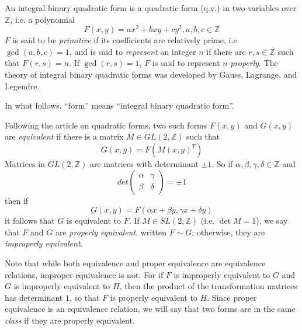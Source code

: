 \documentclass[12pt]{article}
\newcommand{\BZ}{\mathbb{Z}}
\theoremstyle{definition}
\begin{document}
An integral binary quadratic form is a quadratic form (q.v.) in two variables over $\BZ$, i.e. a polynomial
\[
  F(x,y)=ax^2+bxy+cy^2, a,b,c\in\BZ
\]
$F$ is said to be \emph{primitive} if its coefficients are relatively prime, i.e. $\gcd(a,b,c)=1$, and is said to \emph{represent} an integer $n$ if there are $r,s\in\BZ$ such that $F(r,s)=n$. If $\gcd(r,s)=1$, $F$ is said to represent $n$ \emph{properly}. The theory of integral binary quadratic forms was developed by Gauss, Lagrange, and Legendre.

In what follows, ``form'' means ``integral binary quadratic form''.

Following the article on quadratic forms, two such forms $F(x,y)$ and $G(x,y)$ are \emph{equivalent} if there is a matrix $M\in GL(2,\BZ)$ such that
\[
  G(x,y) = F(M(x,y)^T)
\]
Matrices in $GL(2,\BZ)$ are matrices with determinant $\pm 1$. So if $\alpha,\beta,\gamma, \delta\in\BZ$ and
\begin{displaymath}
det\left( \begin{array}{cc}
\alpha & \gamma \\
\beta & \delta
\end{array}\right) = \pm 1
\end{displaymath}
then if
\[G(x,y)=F(\alpha x + \beta y, \gamma x+\delta y)\]
it follows that $G$ is equivalent to $F$. If $M\in SL(2,\BZ)$ (i.e. $\det M = 1$), we say that $F$ and $G$ are \emph{properly equivalent}, written $F\sim G$; otherwise, they are \emph{improperly equivalent}.

Note that while both equivalence and proper equivalence are equivalence relations, improper equivalence is not. For if $F$ is improperly equivalent to $G$ and $G$ is improperly equivalent to $H$, then the product of the transformation matrices has determinant $1$, so that $F$ is properly equivalent to $H$. Since proper equivalence is an equivalence relation, we will say that two forms are in the same \emph{class} if they are properly equivalent.
\end{document}
